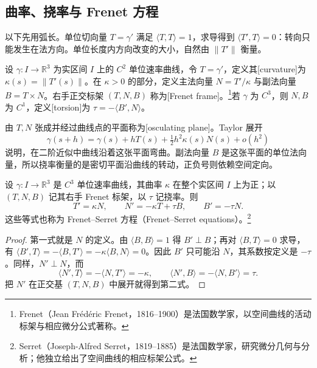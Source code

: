 \subsection{曲率、挠率与 Frenet 方程}
\label{g1:subsec:0701:03}

以下先用弧长。单位切向量 \(T=\gamma'\) 满足 \(\langle T,T\rangle=1\)，求导得到 \(\langle T',T\rangle=0\)：转向只能发生在法方向。单位长度内方向改变的大小，自然由 \(\lVert T'\rVert\) 衡量。

\begin{definition}\label{g1:def:frenet-frame}
	设 \(\gamma:I\to\mathbb R^3\) 为实区间 \(I\) 上的 \(C^2\) 单位速率曲线，令 \(T=\gamma'\)，定义其[curvature]为 \(\kappa(s)=\lVert T'(s)\rVert\)。在 \(\kappa>0\) 的部分，定义主法向量 \(N=T'/\kappa\) 与副法向量 \(B=T\times N\)。右手正交标架 \((T,N,B)\) 称为[Frenet frame]。\footnote{Frenet（Jean Frédéric Frenet，1816--1900）是法国数学家，以空间曲线的活动标架与相应微分公式著称。}若 \(\gamma\) 为 \(C^3\)，则 \(N,B\) 为 \(C^1\)，定义[torsion]为 \(\tau=-\langle B',N\rangle\)。
\end{definition}

由 \(T,N\) 张成并经过曲线点的平面称为[osculating plane]。Taylor 展开
\[
	\gamma(s+h)=\gamma(s)+hT(s)+\tfrac12h^2\kappa(s)N(s)+o(h^2)
\]
说明，在二阶近似中曲线沿着这张平面弯曲。副法向量 \(B\) 是这张平面的单位法向量，所以挠率衡量的是密切平面沿曲线的转动，正负号则依赖空间定向。

\begin{proposition}[Frenet 方程]\label{g1:prop:frenet-equations}
	设 \(\gamma:I\to\mathbb R^3\) 是 \(C^3\) 单位速率曲线，其曲率 \(\kappa\) 在整个实区间 \(I\) 上为正；以 \((T,N,B)\) 记其右手 Frenet 标架，以 \(\tau\) 记挠率。则
	\begin{equation}\label{g1:eq:frenet-equations}
		T'=\kappa N,\qquad N'=-\kappa T+\tau B,\qquad B'=-\tau N.
	\end{equation}
	这些等式也称为 Frenet--Serret 方程（Frenet--Serret equations）。\footnote{Serret（Joseph-Alfred Serret，1819--1885）是法国数学家，研究微分几何与分析；他独立给出了空间曲线的相应标架公式。}
\end{proposition}
\begin{proof}
	第一式就是 \(N\) 的定义。由 \(\langle B,B\rangle=1\) 得 \(B'\perp B\)；再对 \(\langle B,T\rangle=0\) 求导，有 \(\langle B',T\rangle=-\langle B,T'\rangle=-\kappa\langle B,N\rangle=0\)。因此 \(B'\) 只可能沿 \(N\)，其系数按定义是 \(-\tau\)。同样，\(N'\perp N\)，而
	\[
		\langle N',T\rangle=-\langle N,T'\rangle=-\kappa,\qquad
		\langle N',B\rangle=-\langle N,B'\rangle=\tau.
	\]
	把 \(N'\) 在正交基 \((T,N,B)\) 中展开就得到第二式。
\end{proof}

